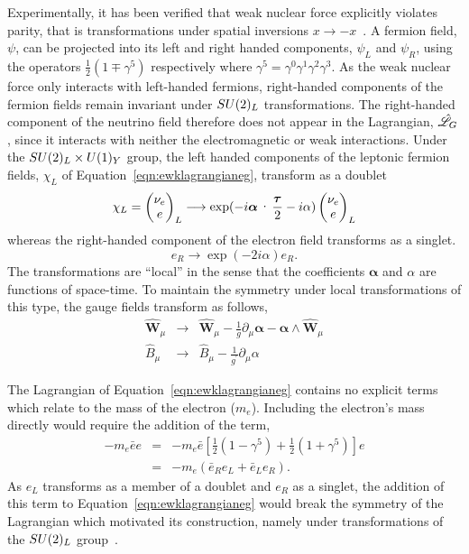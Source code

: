 Experimentally, it has been verified that weak nuclear force explicitly violates
parity, that is transformations under spatial inversions $x\rightarrow -x$~\citep{null}.
A fermion field, $\psi$, can be projected into its left and right handed components, 
$\psi_{L}$ and $\psi_{R}$, using the operators $\frac{1}{2}(1\mp\gamma^{5})$ respectively 
where $\gamma^{5} = \gamma^{0}\gamma^{1}\gamma^{2}\gamma^{3}$.  
As the weak nuclear force only interacts with left-handed fermions, 
right-handed components of the fermion fields remain invariant under $SU(2)_{L}$ transformations.
The right-handed component of the neutrino field therefore does not appear 
in the Lagrangian, $\hat{\mathscr{L}}_{G}$, since it interacts with neither the electromagnetic or weak interactions.
Under the $SU(2)_{L}\times U(1)_{Y}$ group, 
the left handed components of the leptonic fermion fields,
$\chi_{L}$ of Equation~\ref{eqn:ewklagrangianeg}, transform as a doublet
\begin{equation}
\chi_{L}  =   
\everymath{\displaystyle} \begin{pmatrix}
\nu_{e} \\ 
e
\end{pmatrix}_{L}
 \longrightarrow 
\exp(-i\boldsymbol\alpha\cdot\frac{\boldsymbol\tau}{2} - i\alpha) 
\begin{pmatrix}
\nu_{e} \\ 
e
\end{pmatrix}_{L}
\end{equation}
\label{eqn:doublettrans}
whereas the right-handed component of the electron field transforms as a singlet.  
\begin{equation}
e_{R}
 \longrightarrow 
\exp(-2i{\alpha}) 
e_{R}.
\end{equation}
The transformations are ``local'' in the sense that the coefficients  
$\boldsymbol{\alpha}$ and $\alpha$ are functions of space-time. 
To maintain the symmetry under local transformations of this type, the gauge fields
transform as follows, 
\begin{eqnarray}
\hat{\mathbf{W}}_{\mu} & 
 \longrightarrow & 
\hat{\mathbf{W}}_{\mu} - \frac{1}{g}\partial_{\mu}\boldsymbol{\alpha} 
	- \boldsymbol{\alpha}\wedge\hat{\mathbf{W}}_{\mu} \\
\hat{{B}}_{\mu} & 
 \longrightarrow & 
\hat{{B}}_{\mu} - \frac{1}{g^{\prime}}\partial_{\mu}{\alpha} 
\end{eqnarray}

The Lagrangian of Equation~\ref{eqn:ewklagrangianeg} contains no explicit terms which 
relate to the mass of the electron ($m_{e}$). Including the electron's mass directly would 
require the addition of the term,
\begin{eqnarray}
-m_{e}\bar{e}e  &=& -m_{e}\bar{e}\left[\frac{1}{2}\left(1-\gamma^{5}\right) 
		    + \frac{1}{2}\left(1+\gamma^{5}\right)\right]e \nonumber \\
		&=& -m_{e}\left(\bar{e}_{R}e_{L} + \bar{e}_{L}e_{R}\right).
\end{eqnarray}
As $e_{L}$ transforms as a member of a doublet and $e_{R}$ as a singlet, 
the addition of this term to Equation~\ref{eqn:ewklagrangianeg} 
would break the symmetry of the Lagrangian which motivated its construction, 
namely under transformations of the $SU(2)_{L}$ group~\citep{aitchison}.

